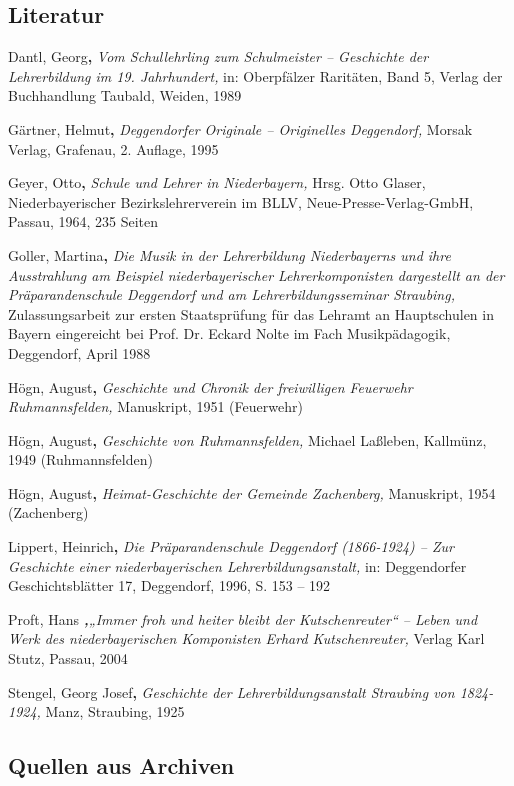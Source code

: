 \documentclass{book}
\begin{document}
\subsection{Literatur}

Dantl, Georg\textbf{,} \textit{Vom Schullehrling zum Schulmeister –
Geschichte der Lehrerbildung im 19. Jahrhundert,} in: Oberpfälzer
Raritäten, Band 5, Verlag der Buchhandlung Taubald, Weiden, 1989

Gärtner, Helmut\textbf{,} \textit{Deggendorfer Originale – Originelles
Deggendorf,} Morsak Verlag, Grafenau, 2. Auflage, 1995

Geyer, Otto\textbf{,} \textit{Schule und Lehrer in Niederbayern,} Hrsg.
Otto Glaser, Niederbaye\-rischer Bezirkslehrerverein im BLLV,
Neue-Presse-Verlag-GmbH, Passau, 1964, 235 Seiten

Goller, Martina\textbf{,} \textit{Die Musik in der Lehrerbildung
Niederbayerns und ihre Ausstrah\-lung am Beispiel niederbayerischer
Lehrerkomponisten dargestellt an der Präparanden\-schule Deggendorf und
am Lehrerbildungsseminar Straubing,} Zulassungsarbeit zur ersten
Staatsprüfung für das Lehramt an Hauptschulen in Bayern einge\-reicht
bei Prof. Dr. Eckard Nolte im Fach Musikpädagogik, Deggendorf, April
1988

Högn, August\textbf{,} \textit{Geschichte und Chronik der freiwilligen
Feuerwehr Ruhmannsfelden,} Manuskript, 1951 (Feuerwehr)

Högn, August\textbf{,} \textit{Geschichte von Ruhmannsfelden,} Michael
Laßleben, Kallmünz, 1949 (Ruhmannsfelden)

Högn, August\textbf{,} \textit{Heimat-Geschichte der Gemeinde
Zachenberg,} Manuskript, 1954 (Zachenberg)

Lippert, Heinrich\textbf{,} \textit{Die Präparandenschule Deggendorf
(1866-1924) – Zur Geschichte einer niederbayerischen
Lehrerbildungsanstalt,} in: Deggendorfer Geschichtsblät\-ter 17,
Deggendorf, 1996, S. 153 – 192

Proft, Hans \textbf{\textit{,}}\textit{„Immer froh und heiter bleibt der
Kutschenreuter“ – Leben und Werk des niederbayerischen Komponisten
Erhard Kutschenreuter,} Verlag Karl Stutz, Passau, 2004

Stengel, Georg Josef\textbf{,} \textit{Geschichte der
Lehrerbildungsanstalt Straubing von 1824-1924,} Manz, Straubing, 1925

\subsection{Quellen aus Archiven}
\end{document}
